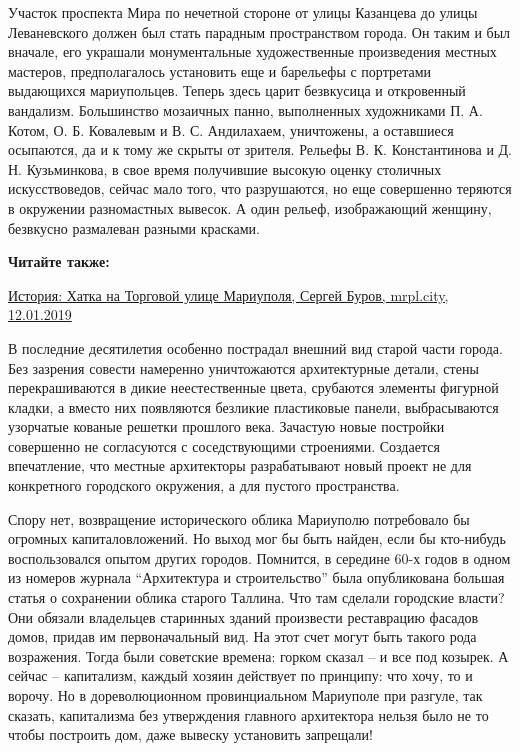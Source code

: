 Участок проспекта Мира по нечетной стороне от улицы Казанцева до улицы
Леваневского должен был стать парадным пространством города. Он таким и был
вначале, его украшали монументальные художественные произведения местных
мастеров, предполагалось установить еще и барельефы с портретами выдающихся
мариупольцев. Теперь здесь царит безвкусица и откровенный вандализм.
Большинство мозаичных панно, выполненных художниками П. А. Котом, О. Б.
Ковалевым и В. С. Андилахаем, уничтожены, а оставшиеся осыпаются, да и к тому
же скрыты от зрителя. Рельефы В. К. Константинова и Д. Н. Кузьминкова, в свое
время получившие высокую оценку столичных искусствоведов, сейчас мало того, что
разрушаются, но еще совершенно теряются в окружении разномастных вывесок. А
один рельеф, изображающий женщину, безвкусно размалеван разными красками.

\textbf{Читайте также:} 

\href{https://archive.org/details/12_01_2019.sergij_burov.mrpl_city.istoria_hatka_na_torgovoj_ulice_mariupolja}{%
История: Хатка на Торговой улице Мариуполя, Сергей Буров, mrpl.city, 12.01.2019}

В последние десятилетия особенно пострадал внешний вид старой части города.
Без зазрения совести намеренно уничтожаются архитектурные детали, стены
перекрашиваются в дикие неестественные цвета, срубаются элементы фигурной
кладки, а вместо них появляются безликие пластиковые панели, выбрасываются
узорчатые кованые решетки прошлого века. Зачастую новые постройки совершенно
не согласуются с соседствующими строениями. Создается впечатление, что местные
архитекторы разрабатывают новый проект не для конкретного городского
окружения, а для пустого пространства.

Спору нет, возвращение исторического облика Мариуполю потребовало бы огромных
капиталовложений. Но выход мог бы быть найден, если бы кто-нибудь
воспользовался опытом других городов. Помнится, в середине 60-х годов в одном
из номеров журнала \enquote{Архитектура и строительство} была опубликована большая
статья о сохранении облика старого Таллина. Что там сделали городские власти?
Они обязали владельцев старинных зданий произвести реставрацию фасадов домов,
придав им первоначальный вид. На этот счет могут быть такого рода возражения.
Тогда были советские времена: горком сказал – и все под козырек. А сейчас –
капитализм, каждый хозяин действует по принципу: что хочу, то и ворочу. Но в
дореволюционном провинциальном Мариуполе при разгуле, так сказать, капитализма
без утверждения главного архитектора нельзя было не то чтобы построить дом,
даже вывеску установить запрещали!


